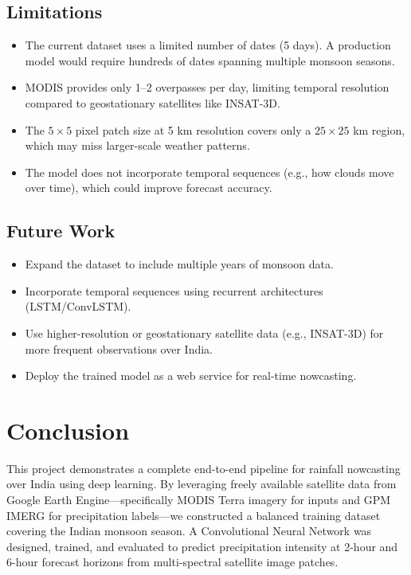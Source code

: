 \documentclass[12pt, a4paper]{report}
\begin{document}
\section{Limitations}

\begin{itemize}
    \item The current dataset uses a limited number of dates (5 days). A production model would require hundreds of dates spanning multiple monsoon seasons.
    \item MODIS provides only 1--2 overpasses per day, limiting temporal resolution compared to geostationary satellites like INSAT-3D.
    \item The $5 \times 5$ pixel patch size at 5 km resolution covers only a $25 \times 25$ km region, which may miss larger-scale weather patterns.
    \item The model does not incorporate temporal sequences (e.g., how clouds move over time), which could improve forecast accuracy.
\end{itemize}

\section{Future Work}

\begin{itemize}
    \item Expand the dataset to include multiple years of monsoon data.
    \item Incorporate temporal sequences using recurrent architectures (LSTM/ConvLSTM).
    \item Use higher-resolution or geostationary satellite data (e.g., INSAT-3D) for more frequent observations over India.
    \item Deploy the trained model as a web service for real-time nowcasting.
\end{itemize}


\chapter{Conclusion}

This project demonstrates a complete end-to-end pipeline for rainfall nowcasting over India using deep learning. By leveraging freely available satellite data from Google Earth Engine---specifically MODIS Terra imagery for inputs and GPM IMERG for precipitation labels---we constructed a balanced training dataset covering the Indian monsoon season. A Convolutional Neural Network was designed, trained, and evaluated to predict precipitation intensity at 2-hour and 6-hour forecast horizons from multi-spectral satellite image patches.
\end{document}
